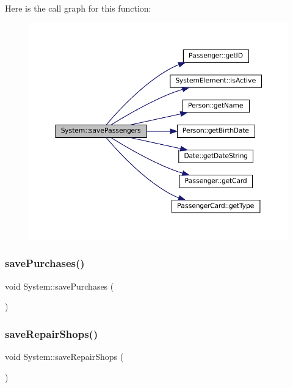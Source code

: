 Here is the call graph for this function\+:
\nopagebreak
\begin{figure}[H]
\begin{center}
\leavevmode
\includegraphics[width=350pt]{classSystem_a43da2cea53bae53723d572855cfbe817_cgraph}
\end{center}
\end{figure}
\mbox{\label{classSystem_a49f432c40f4b1a503416f47517264648}} 
\subsubsection{\texorpdfstring{save\+Purchases()}{savePurchases()}}
{\footnotesize\ttfamily void System\+::save\+Purchases (\begin{DoxyParamCaption}{ }\end{DoxyParamCaption})}

\mbox{\label{classSystem_a062c2502fcf944ecec0a84003042eecd}} 
\subsubsection{\texorpdfstring{save\+Repair\+Shops()}{saveRepairShops()}}
{\footnotesize\ttfamily void System\+::save\+Repair\+Shops (\begin{DoxyParamCaption}{ }\end{DoxyParamCaption})}

